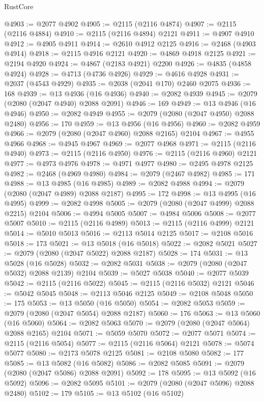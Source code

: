 \begin{lexlean}{RustCore}
\begin{coremodule}
@4903 := @2077 @4902
@4905 := @2115 (@2116 @4874)
@4907 := @2115 (@2116 @4884)
@4910 := @2115 (@2116 @4894) @2121
@4911 := @4907 @4910
@4912 := @4905 @4911
@4914 := @2610 @4912 @2125
@4916 := @2468 (@4903 @4914)
@4918 := @2115 @4916 @2121
@4920 := @4869 @4918 @2125
@4921 := @2194 @4920
@4924 := @4867 (@2183 @4921) @2200
@4926 := @4835 (@4858 @4924)
@4928 := @4713 (@4736 @4926)
@4929 := @4616 @4928
@4931 := @2037 (@4543 @4929)
@4935 := @2038 (@2041 @170) @2460 @2075
@4936 := 168
@4939 := @13 @4936 (@16 @4936)
@4940 := @2082 @4939
@4945 := @2079 (@2080 (@2047 @4940) @2088 @2091)
@4946 := 169
@4949 := @13 @4946 (@16 @4946)
@4950 := @2082 @4949
@4955 := @2079 (@2080 (@2047 @4950) @2088 @2480)
@4956 := 170
@4959 := @13 @4956 (@16 @4956)
@4960 := @2082 @4959
@4966 := @2079 (@2080 (@2047 @4960) @2088 @2165) @2104
@4967 := @4955 @4966
@4968 := @4945 @4967
@4969 := @2077 @4968
@4971 := @2115 (@2116 @4940)
@4973 := @2115 (@2116 @4950)
@4976 := @2115 (@2116 @4960) @2121
@4977 := @4973 @4976
@4978 := @4971 @4977
@4980 := @2495 @4978 @2125
@4982 := @2468 (@4969 @4980)
@4984 := @2079 (@2467 @4982)
@4985 := 171
@4988 := @13 @4985 (@16 @4985)
@4989 := @2082 @4988
@4994 := @2079 (@2080 (@2047 @4989) @2088 @2187)
@4995 := 172
@4998 := @13 @4995 (@16 @4995)
@4999 := @2082 @4998
@5005 := @2079 (@2080 (@2047 @4999) @2088 @2215) @2104
@5006 := @4994 @5005
@5007 := @4984 @5006
@5008 := @2077 @5007
@5010 := @2115 (@2116 @4989)
@5013 := @2115 (@2116 @4999) @2121
@5014 := @5010 @5013
@5016 := @2113 @5014 @2125
@5017 := @2108 @5016
@5018 := 173
@5021 := @13 @5018 (@16 @5018)
@5022 := @2082 @5021
@5027 := @2079 (@2080 (@2047 @5022) @2088 @2187)
@5028 := 174
@5031 := @13 @5028 (@16 @5028)
@5032 := @2082 @5031
@5038 := @2079 (@2080 (@2047 @5032) @2088 @2139) @2104
@5039 := @5027 @5038
@5040 := @2077 @5039
@5042 := @2115 (@2116 @5022)
@5045 := @2115 (@2116 @5032) @2121
@5046 := @5042 @5045
@5048 := @2113 @5046 @2125
@5049 := @2108 @5048
@5050 := 175
@5053 := @13 @5050 (@16 @5050)
@5054 := @2082 @5053
@5059 := @2079 (@2080 (@2047 @5054) @2088 @2187)
@5060 := 176
@5063 := @13 @5060 (@16 @5060)
@5064 := @2082 @5063
@5070 := @2079 (@2080 (@2047 @5064) @2088 @2165) @2104
@5071 := @5059 @5070
@5072 := @2077 @5071
@5074 := @2115 (@2116 @5054)
@5077 := @2115 (@2116 @5064) @2121
@5078 := @5074 @5077
@5080 := @2173 @5078 @2125
@5081 := @2108 @5080
@5082 := 177
@5085 := @13 @5082 (@16 @5082)
@5086 := @2082 @5085
@5091 := @2079 (@2080 (@2047 @5086) @2088 @2091)
@5092 := 178
@5095 := @13 @5092 (@16 @5092)
@5096 := @2082 @5095
@5101 := @2079 (@2080 (@2047 @5096) @2088 @2480)
@5102 := 179
@5105 := @13 @5102 (@16 @5102)

\end{coremodule}
\end{lexlean}
